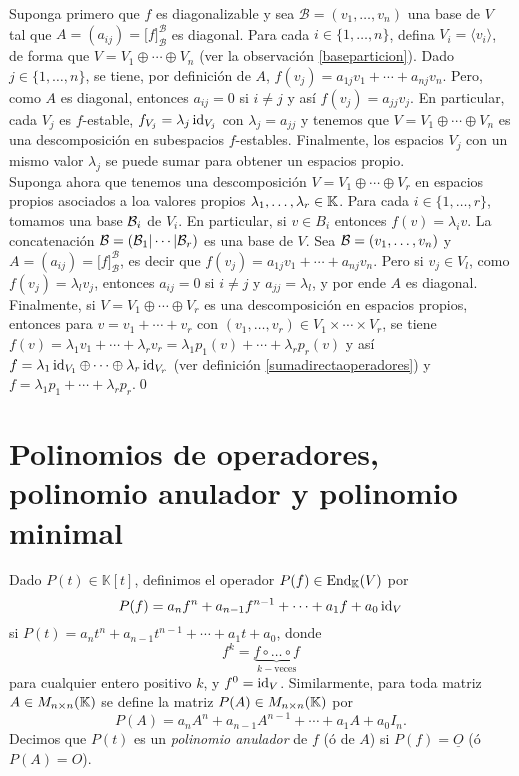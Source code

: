 \dem Suponga primero que $f$ es diagonalizable y sea $\mathcal{B}=(v_1,\ldots,v_n)$ una base de $V$ tal que $A=(a_{ij})=\Big[f\Big]^{\mathcal{B}}_{\mathcal{B}}$ es diagonal. Para cada $i\in\{1,\ldots,n\}$, defina $V_i=\langle v_i\rangle$, de forma que $V=V_1\oplus\cdots\oplus V_n$ (ver la observación \ref{baseparticion}). Dado $j\in\{1,\ldots,n\}$, se tiene, por definición de $A$, $f(v_j)=a_{1j}v_1+\cdots+a_{nj}v_n$. Pero, como $A$ es diagonal, entonces $a_{ij}=0$ si $i\ne j$ y así $f(v_j)=a_{jj}v_j$. En particular, cada $V_j$ es $f$-estable, $f_{V_j}=\lambda_j\operatorname{id}_{V_j}$ con $\lambda_j=a_{jj}$ y tenemos que $V=V_1\oplus\cdots\oplus V_n$ es una descomposición en subespacios $f$-estables. Finalmente, los espacios $V_j$ con un mismo valor $\lambda_j$ se puede sumar para obtener un espacios propio.\\
Suponga ahora que tenemos una descomposición $V=V_1\oplus\cdots\oplus V_r$ en espacios propios asociados a loa valores propios $\lambda_1,\ldots,\lambda_r\in\mathbb{K}$. Para cada $i\in\{1,\ldots,r\}$, tomamos una base $\mathcal{B}_i$ de $V_i$. En particular, si $v\in B_i$ entonces $f(v)=\lambda_iv$. La concatenación $\mathcal{B}=\left(\mathcal{B}_1|\cdots|\mathcal{B}_r\right)$ es una base de $V$. Sea $\mathcal{B}=(v_1,\ldots,v_n)$ y $A=(a_{ij})=\Big[f\Big]^{\mathcal{B}}_{\mathcal{B}}$, es decir que $f(v_j)=a_{1j}v_1+\cdots+a_{nj}v_n$. Pero si $v_j\in V_l$, como $f(v_j)=\lambda_lv_j$, entonces $a_{ij}=0$ si $i\ne j$ y $a_{jj}=\lambda_l$, y por ende $A$ es diagonal.\\
Finalmente, si $V=V_1\oplus\cdots\oplus V_r$ es una descomposición en espacios propios, entonces para $v=v_1+\cdots+v_r$ con $(v_1,\ldots,v_r)\in V_1\times\cdots\times V_r$, se tiene $f(v)=\lambda_1v_1+\cdots+\lambda_rv_r = \lambda_1p_1(v)+\cdots+\lambda_rp_r(v)$ y así $f=\lambda_1\operatorname{id}_{V_1}\oplus\cdots\oplus\lambda_r\operatorname{id}_{V_r}$ (ver definición \ref{sumadirectaoperadores}) y $f=\lambda_1p_1+\cdots+\lambda_rp_r$.\qed

\section{Polinomios de operadores, polinomio anulador y polinomio minimal}

  \begin{defn}
    Dado $P(t)\in \mathbb{K}[t]$, definimos el operador $P(f)\in\operatorname{End}_\mathbb{K}(V)$ por
    \[
      P(f)=a_nf^n+a_{n-1}f^{n-1}+\cdots+a_1f+a_0\operatorname{id}_V
    \]
    si $P(t)=a_nt^n+a_{n-1}t^{n-1}+\cdots+a_1t+a_0$, donde
    \[
      f^k=\underbrace{f\circ\ldots\circ f}_{k-\textrm{veces}}
    \]
    para cualquier entero positivo $k$, y $f^0=\operatorname{id}_V$. Similarmente, para toda matriz $A\in M_{n\times n}(\mathbb{K})$ se define la matriz $P(A)\in M_{n\times n}(\mathbb{K})$ por
    \[
      P(A)=a_nA^n+a_{n-1}A^{n-1}+\cdots+a_1A+a_0I_n.
    \]
    Decimos que $P(t)$ es un \emph{polinomio anulador} de $f$ (ó de $A$) si $P(f)=\underline{O}$ (ó $P(A)=O$).
  \end{defn}
  
